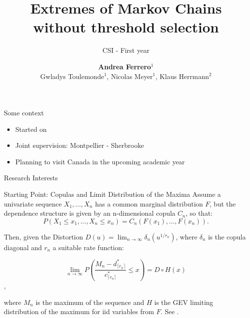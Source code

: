 \documentclass[10pt, aspectratio=169]{beamer}
\title{Extremes of Markov Chains without threshold selection}
\subtitle{CSI - First year}
\author{
  \textbf{Andrea Ferrero}$^{1}$\\[0.2cm]
  \small Gwladys Toulemonde$^{1}$, Nicolas Meyer$^{1}$, Klaus Herrmann$^{2}$
}
\institute{
  $^{1}$ \textit{University of Montpellier, Lemon Team Inria} \\
  $^{2}$ \textit{University of Sherbrooke}
}
\date{}
\begin{document}
\maketitle

\begin{frame}{Some context}
  \begin{itemize}
    \item Started on 
    \item Joint supervision: Montpellier - Sherbrooke
    \item Planning to visit Canada in the upcoming academic year
  \end{itemize}
\end{frame}

\begin{frame}{Research Interests}

\centering
{}

\end{frame}

\begin{frame}{Starting Point: Copulas and Limit Distribution of the Maxima}
  Assume a univariate sequence $X_1, \dots , X_n$ has a common marginal distribution $F$, but the \alert{dependence} structure is given by an n-dimensional copula $C_n$, so that:
  \[
  P(X_1 \leq x_1, \dots, X_n \leq x_n) = C_n(F(x_1), \dots, F(x_n)).
  \] \pause

  Then, given the \alert{Distortion} $D(u) = \lim_{n \to \infty} \delta_n(u^{1/r_n})$, where $\delta_n$ is the copula \alert{diagonal} and $r_n$ a suitable rate function: \pause

  \[
  \lim_{n \to \infty} P \left(\frac{M_n - d^*_{\lceil{r_n}\rceil}}{c^*_{\lceil{r_n}\rceil}} \leq x \right) = D \circ H(x)
  \],

  where $M_n$ is the maximum of the sequence and $H$ is the GEV limiting distribution of the maximum for iid variables from $F$. See \parencite{herrmann2024}.
\end{frame}
\end{document}

